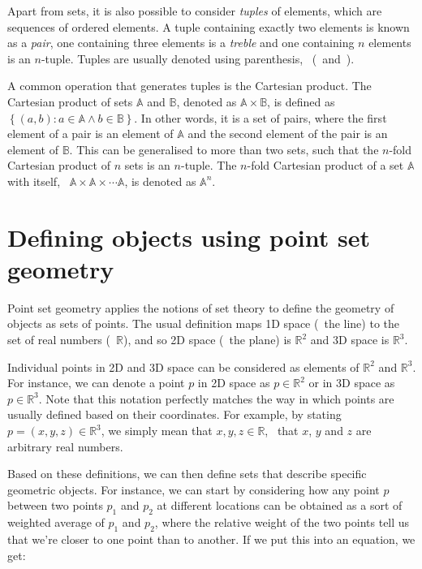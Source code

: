Apart from sets, it is also possible to consider \emph{tuples} of elements, which are sequences of ordered elements.
A tuple containing exactly two elements is known as a \emph{pair}, one containing three elements is a \emph{treble} and one containing \(n\) elements is an \(n\)-tuple.
Tuples are usually denoted using parenthesis, \ie\ (\ and~).

A common operation that generates tuples is the Cartesian product.
The Cartesian product of sets \(\mathbb{A}\) and \(\mathbb{B}\), denoted as \(\mathbb{A} \times \mathbb{B}\), is defined as \(\left\{ (a,b) : a \in \mathbb{A} \wedge b \in \mathbb{B} \right\}\).
In other words, it is a set of pairs, where the first element of a pair is an element of \(\mathbb{A}\) and the second element of the pair is an element of \(\mathbb{B}\).
This can be generalised to more than two sets, such that the \(n\)-fold Cartesian product of \(n\) sets is an \(n\)-tuple.
The \(n\)-fold Cartesian product of a set \(\mathbb{A}\) with itself, \ie\ \(\mathbb{A} \times \mathbb{A} \times \cdots \mathbb{A}\), is denoted as \(\mathbb{A}^n\).

\section{Defining objects using point set geometry}%
\label{sec:ps}

Point set geometry applies the notions of set theory to define the geometry of objects as sets of points.
The usual definition maps 1D space (\ie\ the line) to the set of real numbers (\ie\ \(\mathbb{R}\)), and so 2D space (\ie\ the plane) is \(\mathbb{R}^2\) and 3D space is \(\mathbb{R}^3\).

Individual points in 2D and 3D space can be considered as elements of \(\mathbb{R}^2\) and \(\mathbb{R}^3\).
For instance, we can denote a point \(p\) in 2D space as \(p \in \mathbb{R}^2\) or in 3D space as \(p \in \mathbb{R}^3\).
Note that this notation perfectly matches the way in which points are usually defined based on their coordinates.
For example, by stating \(p = (x, y, z) \in \mathbb{R}^3\), we simply mean that \(x,y,z \in \mathbb{R} \), \ie\ that \(x\), \(y\) and \(z\) are arbitrary real numbers.

Based on these definitions, we can then define sets that describe specific geometric objects.
For instance, we can start by considering how any point \(p\) between two points \(p_1\) and \(p_2\) at different locations can be obtained as a sort of weighted average of \(p_1\) and \(p_2\), where the relative weight of the two points tell us that we're closer to one point than to another.
If we put this into an equation, we get:

